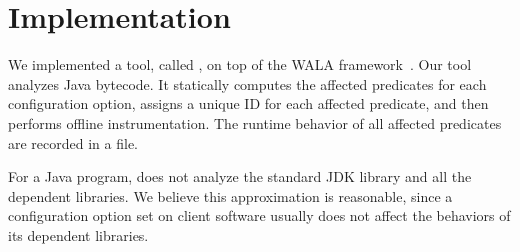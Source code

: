 \section{Implementation}
\label{sec:implementation}

We implemented a tool, called \ourtool, on top of the WALA
framework~\cite{wala}. Our tool analyzes Java bytecode.
It statically computes the affected predicates
for each configuration option, assigns a unique
ID for each affected predicate, and then performs offline instrumentation.
The runtime behavior of all affected predicates are recorded
in a file. 



For a Java program, \ourtool does not analyze the standard JDK
library and all the dependent libraries. We believe this approximation
is reasonable, since a configuration option set on client software
usually does not affect the behaviors of its dependent libraries.

